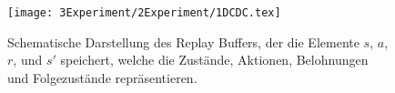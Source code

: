 
\begin{figure}[htbp]
\centering
\texttt{[image: 3Experiment/2Experiment/1DCDC.tex]}
\caption{Schematische Darstellung des Replay Buffers, der die Elemente \( s \), \( a \), \( r \), und \( s' \) speichert, welche die Zustände, Aktionen, Belohnungen und Folgezustände repräsentieren.}
\label{fig:replay-buffer}
\end{figure}
